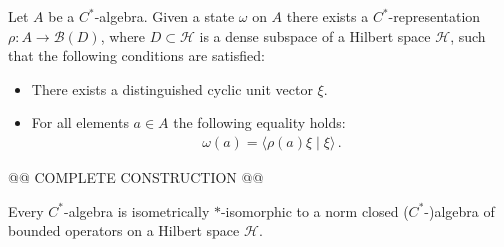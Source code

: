     \begin{construct}\label{operators:gns}
        Let $A$ be a $C^*$-algebra. Given a state $\omega$ on $A$ there exists a $C^*$-representation $\rho:A\rightarrow\mathcal{B}(D)$, where $D\subset\mathcal{H}$ is a dense subspace of a Hilbert space $\mathcal{H}$, such that the following conditions are satisfied:
        \begin{itemize}
            \item There exists a distinguished cyclic unit vector $\xi$.
            \item For all elements $a\in A$ the following equality holds:
                \begin{gather}
                    \omega(a) = \langle\rho(a)\xi\mid\xi\rangle\,.
                \end{gather}
        \end{itemize}

        @@ COMPLETE CONSTRUCTION @@
    \end{construct}

    \begin{theorem}\label{operators:gelfand_naimark}
        Every $C^*$-algebra is isometrically $\ast$-isomorphic to a norm closed ($C^*$-)algebra of bounded operators on a Hilbert space $\mathcal{H}$.
    \end{theorem}

\subsection{}

